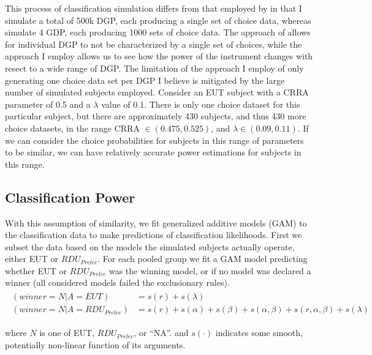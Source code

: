 \documentclass[../main.tex]{subfiles}
\begin{document}
This process of classification simulation differs from that employed by \textcite{Wilcox2015} in that I simulate a total of 500k DGP, each producing a single set of choice data, whereas \textcite{Wilcox2015} simulate 4 GDP, each producing 1000 sets of choice data.
The approach of \textcite{Wilcox2015} allows for individual DGP to not be characterized by a single set of choices, while the approach I employ allows us to see how the power of the instrument changes with resect to a wide range of DGP.
The limitation of the approach I employ of only generating one choice data set per DGP I believe is mitigated by the large number of simulated subjects employed.
Consider an EUT subject with a CRRA parameter of 0.5 and a $\lambda$ value of 0.1.
There is only one choice dataset for this particular subject, but there are approximately 430 subjects, and thus 430 more choice datasets, in the range CRRA $\in (0.475,0.525)$, and $\lambda \in (0.09, 0.11)$.
If we can consider the choice probabilities for subjects in this range of parameters to be similar, we can have relatively accurate power estimations for subjects in this range.

\subsection{\texorpdfstring{\textcite{Harrison2016}}{Harrison and Ng (2016)} Classification Power}

With this assumption of similarity, we fit generalized additive models (GAM) \parencite{Hastie1986} to the classification data to make predictions of classification likelihoods.
First we subset the data based on the models the simulated subjects actually operate, either EUT or $\mathit{RDU_{Prelec}}$.
For each pooled group we fit a GAM model predicting whether EUT or $\mathit{RDU_{Prelec}}$ was the winning model, or if no model was declared a winner (all considered models failed the exclusionary rules).
\begin{align}
	\label{eq4:GAM}
	\begin{split}
		(winner = N | A = EUT)                   &= s(r) + s(\lambda)\\
		(winner = N | A = \mathit{RDU_{Prelec}}) &= s(r) + s(\alpha) + s(\beta) +s(\alpha, \beta) + s(r, \alpha, \beta) + s(\lambda)
	\end{split}
\end{align}

\noindent where $N$ is one of EUT, $\mathit{RDU_{Prelec}}$, or \enquote{NA}. and $s(\cdot)$ indicates some smooth, potentially non-linear function of its arguments.
\end{document}
